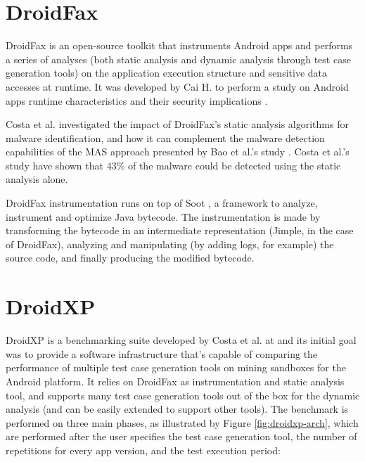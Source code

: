 
\section{DroidFax}

DroidFax is an open-source toolkit that instruments Android apps and performs a series of analyses (both static analysis and dynamic analysis through test case generation tools) on the application execution structure and sensitive data accesses at runtime. It was developed by Cai H. to perform a study on Android apps runtime characteristics and their security implications \cite{cai_understanding_2016}. 

Costa et al. \cite{costa_exploring_2022} investigated the impact of DroidFax's static analysis algorithms for malware identification, and how it can complement the malware detection capabilities of the MAS approach presented by Bao et al.'s study \cite{bao_mining_2018}. Costa et al.'s study have shown that 43\% of the malware could be detected using the static analysis alone.

DroidFax instrumentation runs on top of Soot \cite{vallee-rai_soot_1999, noauthor_soot_nodate}, a framework to analyze, instrument and optimize Java bytecode. The instrumentation is made by transforming the bytecode in an intermediate representation (Jimple, in the case of DroidFax), analyzing and manipulating (by adding logs, for example) the source code, and finally producing the modified bytecode.

\section{DroidXP}

DroidXP is a benchmarking suite developed by Costa et al. at \cite{costa_droidxp_2020} and its initial goal was to provide a software infrastructure that's capable of comparing the performance of multiple test case generation tools on mining sandboxes for the Android platform. It relies on DroidFax as instrumentation and static analysis tool, and supports many test case generation tools out of the box for the dynamic analysis (and can be easily extended to support other tools). The benchmark is performed on three main phases, as illustrated by Figure \ref{fig:droidxp-arch}, which are performed after the user specifies the test case generation tool, the number of repetitions for every app version, and the test execution period:

